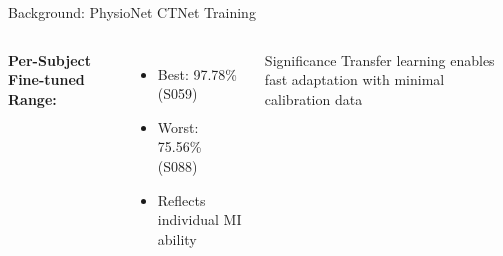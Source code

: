 \documentclass[aspectratio=169, 11pt]{beamer}
\begin{document}
\begin{frame}{Background: PhysioNet CTNet Training}
\begin{columns}[T]
        \vspace{1mm}
        \textbf{Per-Subject Fine-tuned Range:}
        \begin{itemize}
            \item Best: 97.78\% (S059)
            \item Worst: 75.56\% (S088)
            \item Reflects individual MI ability
        \end{itemize}
        
        \vspace{1mm}
        \begin{exampleblock}{Significance}
            Transfer learning enables fast adaptation with minimal calibration data
        \end{exampleblock}
    \end{columns}
\end{frame}
\end{document}
